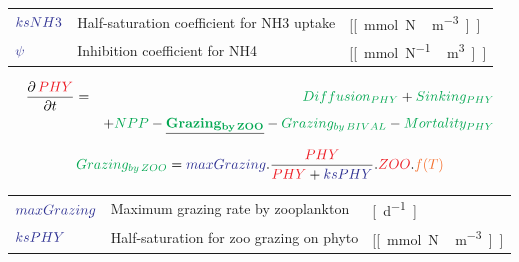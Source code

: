 \documentclass[final,xcolor=dvipsnames]{beamer}
\begin{document}
\begin{frame}
{\begin{exampleblock}{}
\begin{tabular}{ l l l}
	      $\parC[ksNH3]$ &  Half-saturation coefficient for NH3 uptake & [\unit[mmol N\,m^{-3}]] \\
	      $\parC[\psi]$  &   Inhibition coefficient for NH4 & [\unit[mmol N^{-1}\,m^{3}]] 
	    \end{tabular}
	  \end{exampleblock}
	}
      \end{frame} 
      
      \begin{frame}
	\begin{exampleblock}{}
	  \begin{eqnarray*}
	    \small
	    \frac{\partial\,\varC[PHY]}{\partial t} & = & \proC[Diffusion_{PHY}] + \proC[Sinking_{PHY}] \\
	    & & + \proC[NPP] - \underline{\mathbf{\proC[Grazing_{by\,ZOO}]}} - \proC[Grazing_{by\,BIVAL}] - \proC[Mortality_{PHY}]
	  \end{eqnarray*}
	\end{exampleblock}
	\begin{exampleblock}{}
	  \begin{equation*}
	    \proC[Grazing_{by\,ZOO}] = \parC[maxGrazing] . \frac{\varC[PHY]}{\varC[PHY] + \parC[ksPHY]}.\varC[ZOO].\worC[f(T)]
	  \end{equation*}
	    \begin{tabular}{ l l l}
	      $\parC[maxGrazing]$   &  Maximum grazing rate by zooplankton  &  \unit[d^{-1}] \\
	      $\parC[ksPHY]$        & Half-saturation for zoo grazing on phyto  &  [\unit[mmol N\,m^{-3}]]
	    \end{tabular}
	\end{exampleblock}
      \end{frame}
      
\end{document}
